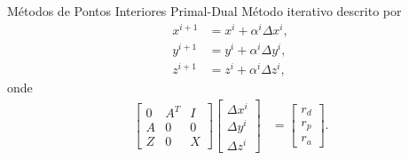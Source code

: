 \documentclass[10pt]{beamer}
\begin{document}
\begin{frame}{Métodos de Pontos Interiores Primal-Dual}
  Método iterativo descrito por
  \begin{align*}
      x^{i + 1} &= x^i + \alpha^i \Delta x^i, \\
      y^{i + 1} &= y^i + \alpha^i \Delta y^i, \\
      z^{i + 1} &= z^i + \alpha^i \Delta z^i,
  \end{align*}
  onde
  \begin{align*}
      \begin{bmatrix}
           0 & A^T & I \\
           A & 0 & 0 \\
           Z & 0 & X
       \end{bmatrix} \begin{bmatrix}
           \Delta x^i \\
           \Delta y^i \\
           \Delta z^i
       \end{bmatrix} &= \begin{bmatrix}
           r_d \\
           r_p \\
           r_a
       \end{bmatrix}.
  \end{align*}
\end{frame}
\end{document}
